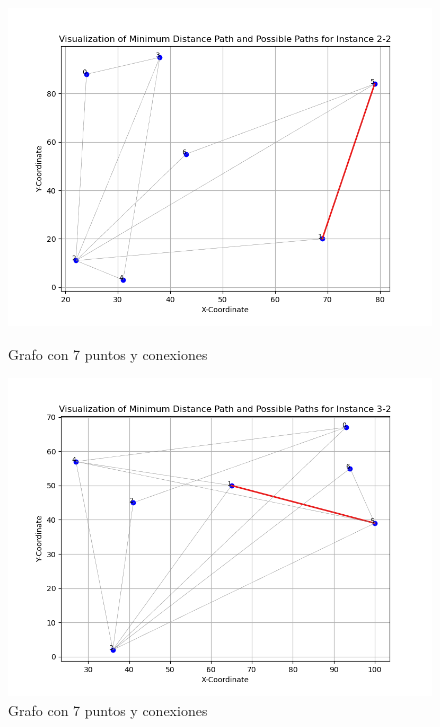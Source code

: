 \documentclass[11pt,openany]{book}
\begin{document}
\begin{figure}[H]
      \centering
      \begin{minipage}{0.49\textwidth}
            \centering
            \includegraphics[width=1.1\textwidth]{assets/Img/GraficaCaminoMinimo-2-2.png}
            \caption{Grafo con 7 puntos y conexiones}
      \end{minipage}
      \hfill
      \begin{minipage}{0.49\textwidth}
            \centering
            \includegraphics[width=1.1\textwidth]{assets/Img/GraficaCaminoMinimo-3-2.png}
            \caption{Grafo con 7 puntos y conexiones}
      \end{minipage}
\end{figure}
\end{document}
